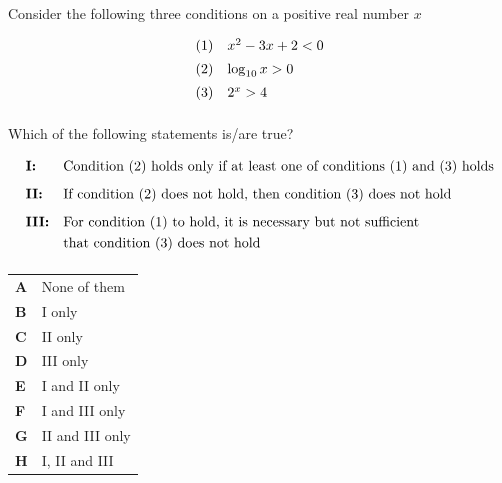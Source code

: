 \documentclass[11pt,a4paper]{article}
\begin{document}
\begin{enumerate}[label=\textbf{\arabic*.},leftmargin=*,itemsep=0pt,start=10]
\questionitem[Logic]
Consider the following three conditions on a positive real number $x$

\[
\begin{array}{@{}ll@{}}
(1) & x^2 - 3x + 2 < 0 \\[5pt]
(2) & \log_{10} x > 0 \\[5pt]
(3) & 2^x > 4 \\[5pt]
\end{array}\]

Which of the following statements is/are true?

\[
\begin{array}{@{}l l@{}}
\textbf{I:} & \text{Condition (2) holds only if at least one of conditions (1) and (3) holds} \\[8pt]
\textbf{II:} & \text{If condition (2) does not hold, then condition (3) does not hold} \\[8pt]
\textbf{III:} &
\begin{aligned}[t]
&\text{For condition (1) to hold, it is necessary but not sufficient} \\
&\text{that condition (3) does not hold} \\[5pt]
\end{aligned}
\end{array}
\]

\par\vspace*{12pt}
\begin{tabularx}{\linewidth}{@{}>{\bfseries}l Y@{}}
A &
None of them
\\[0.8em]
B &
I only
\\[0.8em]
C &
II only
\\[0.8em]
D &
III only
\\[0.8em]
E &
I and II only
\\[0.8em]
F &
I and III only
\\[0.8em]
G &
II and III only
\\[0.8em]
H &
I, II and III
\\
\end{tabularx}
\end{enumerate}
\end{document}
